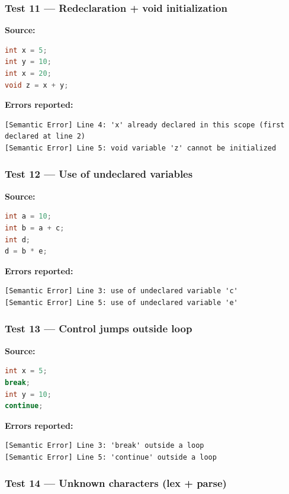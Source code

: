 \documentclass[11pt]{article}
\begin{document}
\subsubsection{Test 11 --- Redeclaration + void initialization}

\textbf{Source:}
\begin{lstlisting}[style=cstyle, language=C]
int x = 5;
int y = 10;
int x = 20;
void z = x + y;
\end{lstlisting}

\textbf{Errors reported:}
\begin{lstlisting}[style=outputstyle]
[Semantic Error] Line 4: 'x' already declared in this scope (first declared at line 2)
[Semantic Error] Line 5: void variable 'z' cannot be initialized
\end{lstlisting}

\subsubsection{Test 12 --- Use of undeclared variables}

\textbf{Source:}
\begin{lstlisting}[style=cstyle, language=C]
int a = 10;
int b = a + c;
int d;
d = b * e;
\end{lstlisting}

\textbf{Errors reported:}
\begin{lstlisting}[style=outputstyle]
[Semantic Error] Line 3: use of undeclared variable 'c'
[Semantic Error] Line 5: use of undeclared variable 'e'
\end{lstlisting}

\subsubsection{Test 13 --- Control jumps outside loop}

\textbf{Source:}
\begin{lstlisting}[style=cstyle, language=C]
int x = 5;
break;
int y = 10;
continue;
\end{lstlisting}

\textbf{Errors reported:}
\begin{lstlisting}[style=outputstyle]
[Semantic Error] Line 3: 'break' outside a loop
[Semantic Error] Line 5: 'continue' outside a loop
\end{lstlisting}

\subsubsection{Test 14 --- Unknown characters (lex + parse)}
\end{document}
